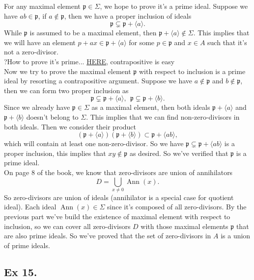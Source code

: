 For any maximal element $\mathfrak p\in \Sigma$, we hope to prove it's a prime ideal.
Suppose we have $ab\in \mathfrak p$, if $a\notin \mathfrak p$, then we have a proper inclusion of ideals 
$$\mathfrak p\subsetneq \mathfrak p+\langle a\rangle.$$ While $\mathfrak p$ is assumed to be a maximal element, then $\mathfrak p+\langle a\rangle\notin \Sigma$. This implies that we will have an element $p+ax\in \mathfrak p+\langle a\rangle$ for some $p\in \mathfrak p$ and $x\in A$ such that it's not a zero-divisor. \\

?How to prove it's prime... \href{https://math.stackexchange.com/questions/44481/showing-the-set-of-zero-divisors-is-a-union-of-prime-ideals}{HERE}, contrapositive is easy \\

Now we try to prove the maximal element $\mathfrak p$ with respect to inclusion is a prime ideal by resorting a contrapositive argument.
Suppose we have $a\notin \mathfrak p$ and $b\notin\mathfrak p$, then we can form two proper inclusion as
$$\mathfrak p\subsetneq \mathfrak p+\langle a\rangle,~~ \mathfrak p\subsetneq \mathfrak p+\langle b\rangle.$$
Since we already have $\mathfrak p\in\Sigma$ as a maximal element, then both ideals $\mathfrak p+\langle a\rangle$ and $\mathfrak p+\langle b\rangle$ doesn't belong to $\Sigma$. This implies that we can find non-zero-divisors in both ideals. Then we consider their product
$$(\mathfrak p+\langle a\rangle)(\mathfrak p+\langle b\rangle)\subset \mathfrak p+\langle ab\rangle,$$ which will contain at least one non-zero-divisor. So we have $\mathfrak p\subsetneq\mathfrak p+\langle ab\rangle$ is a proper inclusion, this implies that $xy\notin \mathfrak p$ as desired. So we've verified that $\mathfrak p$ is a prime ideal.\\

On page 8 of the book, we know that zero-divisors are union of annihilators 
$$D=\bigcup_{x\neq 0} \operatorname{Ann}(x).$$ So zero-divisors are union of ideals (annihilator is a special case for quotient ideal). Each ideal $\operatorname{Ann}(x)\in \Sigma$ since it's composed of all zero-divisors. By the previous part we've build the existence of maximal element with respect to inclusion, so we can cover all zero-divisors $D$ with those maximal elements $\mathfrak p$ that are also prime ideals. So we've proved that the set of zero-divisors in $A$ is a union of prime ideals.



\subsection{Ex 15.}

